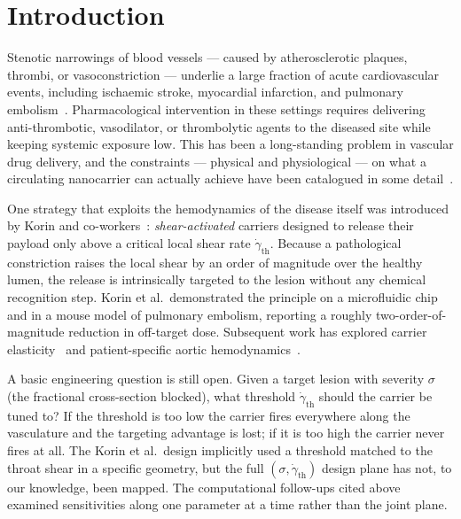 \documentclass[11pt,a4paper]{article}
\begin{document}
\section{Introduction}
\label{sec:intro}

Stenotic narrowings of blood vessels --- caused by atherosclerotic
plaques, thrombi, or vasoconstriction --- underlie a large fraction
of acute cardiovascular events, including ischaemic stroke,
myocardial infarction, and pulmonary
embolism~\citep{wootton1999fluid,malek1999hemodynamic}.
Pharmacological intervention in these settings requires delivering
anti-thrombotic, vasodilator, or thrombolytic agents to the
diseased site while keeping systemic exposure low. This has been
a long-standing problem in vascular drug delivery, and the
constraints --- physical and physiological --- on what a circulating
nanocarrier can actually achieve have been catalogued in some
detail~\citep{decuzzi2008design,florence2012targeting}.

One strategy that exploits the hemodynamics of the disease itself
was introduced by Korin and
co-workers~\citep{korin2012shear}: \emph{shear-activated}
carriers designed to release their payload only above a critical
local shear rate $\dot\gamma_{\text{th}}$. Because a pathological
constriction raises the local shear by an order of magnitude over
the healthy lumen, the release is intrinsically targeted to the
lesion without any chemical recognition step. Korin et al.\
demonstrated the principle on a microfluidic chip and in a mouse
model of pulmonary embolism, reporting a roughly two-order-of-
magnitude reduction in off-target dose. Subsequent work has
explored carrier elasticity~\citep{anselmo2017impact} and
patient-specific aortic
hemodynamics~\citep{qiao2021mathematical}.

A basic engineering question is still open. Given a target lesion
with severity $\sigma$ (the fractional cross-section blocked), what
threshold $\dot\gamma_{\text{th}}$ should the carrier be tuned to?
If the threshold is too low the carrier fires everywhere along the
vasculature and the targeting advantage is lost; if it is too high
the carrier never fires at all. The Korin et al.\ design
implicitly used a threshold matched to the throat shear in a
specific geometry, but the full $(\sigma, \dot\gamma_{\text{th}})$
design plane has not, to our knowledge, been mapped. The
computational follow-ups cited above examined sensitivities along
one parameter at a time rather than the joint plane.
\end{document}
